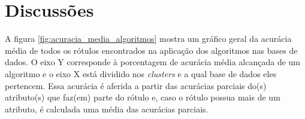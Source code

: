 



\section{Discussões}


A figura  \ref{fig:acuracia_media_algoritmos} mostra um gráfico geral da acurácia média de todos os rótulos encontrados na aplicação dos algoritmos nas bases de dados. O eixo Y corresponde à porcentagem de acurácia média alcançada de um algoritmo e o eixo X está dividido nos \textit{clusters} e a qual base de dados eles pertencem. Essa acurácia é aferida a partir das acurácias parciais do(s) atributo(s) que faz(em) parte do rótulo e, caso o rótulo possua mais de um atributo, é calculada uma média das acurácias parciais. 

